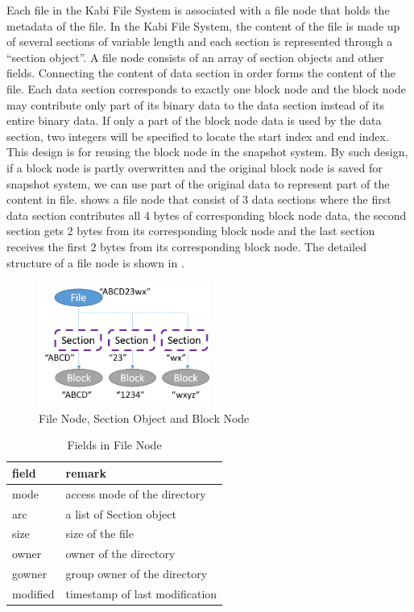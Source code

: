     Each file in the Kabi File System is associated with a file node that holds the metadata of the file. In the Kabi File System, the content of the file is made up of several sections of variable length and each section is represented through a ``section object''. A file node consists of an array of section objects and other fields. Connecting the content of data section in order forms the content of the file. Each data section corresponds to exactly one block node and the block node may contribute only part of its binary data to the data section instead of its entire binary data. If only a part of the block node data is used by the data section, two integers will be specified to locate the start index and end index. This design is for reusing the block node in the snapshot system. By such design, if a block node is partly overwritten and the original block node is saved for snapshot system, we can use part of the original data to represent part of the content in file.  shows a file node that consist of 3 data sections where the first data section contributes all 4 bytes of corresponding block node data, the second section gets 2 bytes from its corresponding block node and the last section receives the first 2 bytes from its corresponding block node. The detailed structure of a file node is shown in .

\begin{figure}[t]
\centering
\includegraphics[width=0.5\textwidth]{Chapter-3/figs/fig7.png}
\caption{File Node, Section Object and Block Node}
\label{fig:file_and_section}
\end{figure}


\begin{table}[t]
\caption{Fields in File Node}
\label{tab:file_fields}
\begin{center}
\begin{tabular}{ll}
\toprule
field & remark\\
\midrule
mode & access mode of the directory\\
arc & a list of Section object\\
size & size of the file\\
owner & owner of the directory\\
gowner & group owner of the directory\\
modified & timestamp of last modification\\
\bottomrule
\end{tabular}
\end{center}
\end{table}

